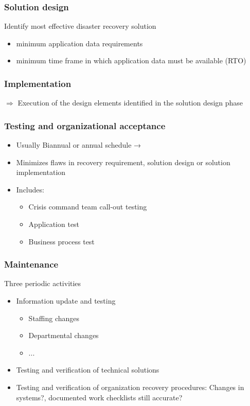 \documentclass{article}
\begin{document}
	\subsubsection{Solution design}
	Identify most effective disaster recovery solution
	\begin{itemize}
		\item minimum application data requirements
		\item minimum time frame in which application data must be available (RTO)
	\end{itemize}

	\subsubsection{Implementation}
		$\Rightarrow$  Execution of the design elements identified in the solution design phase

		\subsubsection{Testing and organizational acceptance}
		
		\begin{itemize}
			\item Usually Biannual or annual schedule → 
			\item Minimizes flaws in recovery requirement, solution design or solution implementation
			\item Includes:
				\begin{itemize}
					\item Crisis command team call-out testing
					\item Application test 
					\item Business process test 
				\end{itemize}
		\end{itemize}


		\subsubsection{Maintenance}
		Three periodic activities
		\begin{itemize}
			\item Information update and testing
				\begin{itemize}
					\item Staffing changes
					\item Departmental changes
					\item ...
				\end{itemize}
			\item Testing and verification of technical solutions
			\item Testing and verification of organization recovery procedures: Changes in systems?, documented work checklists still accurate? 
		\end{itemize}
\end{document}
